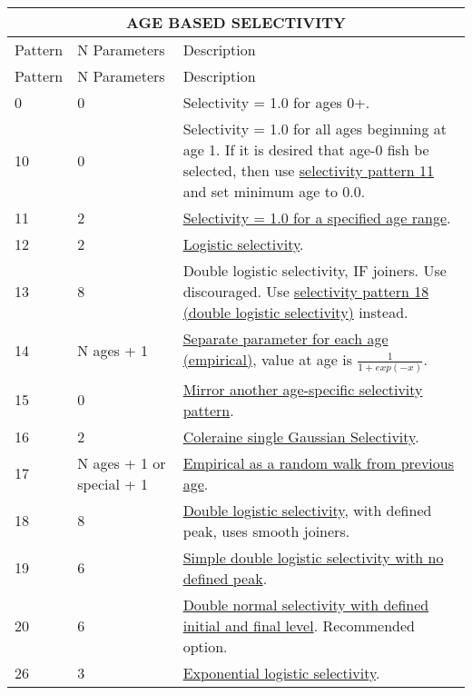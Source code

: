 \begin{longtable}{p{2cm} p{3cm} p{10cm}}
	\multicolumn{3}{c}{AGE BASED SELECTIVITY} \\
	\endfirsthead

	\hline
	Pattern & N Parameters & Description \Tstrut\Bstrut\\
	\hline
	\endhead

	\hline
	\endfoot
	\endlastfoot
	
	\hline
	Pattern & N Parameters & Description \Tstrut\Bstrut\\
	\hline
	0  \Tstrut & 0 & Selectivity = 1.0 for ages 0+.\\
	10 \Tstrut & 0 & Selectivity = 1.0 for all ages beginning at age 1. If it is desired that age-0 fish be selected, then use \hyperlink{DoubleLogSelectivity}{selectivity pattern 11} and set minimum age to 0.0. \\
	11 \Tstrut & 2 & \hyperlink{SelectivityOneRange}{Selectivity = 1.0 for a specified age range}. \\
	12 \Tstrut & 2 & \hyperlink{LogisticSelectivity}{Logistic selectivity}. \\
	13 \Tstrut & 8 & Double logistic selectivity, IF joiners. Use discouraged. Use \hyperlink{DoubleLogSelectivity}{selectivity pattern 18 (double logistic selectivity)} instead. \\
	14 \Tstrut & N ages + 1 & \hyperlink{ReviseAge}{Separate parameter for each age (empirical)}, value at age is $\frac{1}{1+exp(-x)}$. \\
	15 \Tstrut & 0 & \hyperlink{MirrorAnotherSelectivity}{Mirror another age-specific selectivity pattern}. \\
	16 \Tstrut & 2 & \hyperlink{GaussianSelectivity}{Coleraine single Gaussian Selectivity}. \\
	17 \Tstrut & N ages + 1 or special + 1 & \hyperlink{RandomWalk}{Empirical as a random walk from previous age}. \\
	18 \Tstrut & 8 & \hyperlink{DoubleLogSelectivity}{Double logistic selectivity}, with defined peak, uses smooth joiners. \\
	19 \Tstrut & 6 & \hyperlink{SimpleDoubleLog}{Simple double logistic selectivity with no defined peak}. \\
	20 \Tstrut & 6 & \hyperlink{DoubleNormalPeak}{Double normal selectivity with defined initial and final level}. Recommended option. \\
	26 \Tstrut & 3 & \hyperlink{ExponentialLogistic}{Exponential logistic selectivity}. \\

\end{longtable}
